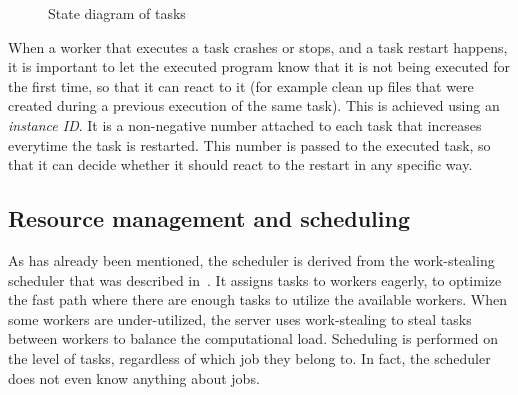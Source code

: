 \begin{figure}[h]
	\centering
	\caption{State diagram of \hyperqueue{} tasks}
	\label{fig:hq-task-state-diagram}
\end{figure}

When a worker that executes a task crashes or stops, and a task restart happens, it is important to
let the executed program know that it is not being executed for the first time, so that it can
react to it (for example clean up files that were created during a previous execution of the same
task). This is achieved using an \emph{instance ID}. It is a non-negative number attached to
each task that increases everytime the task is restarted. This number is passed to the executed
task, so that it can decide whether it should react to the restart in any specific way.

\subsection{Resource management and scheduling}
As has already been mentioned, the \hyperqueue{} scheduler is derived from the
\rsds{} work-stealing scheduler that was described in~. It
assigns tasks to workers eagerly, to optimize the fast path where there are enough tasks to utilize
the available workers. When some workers are under-utilized, the server uses work-stealing to steal
tasks between workers to balance the computational load. Scheduling is performed on the level of
tasks, regardless of which job they belong to. In fact, the scheduler does not even know anything
about jobs.

